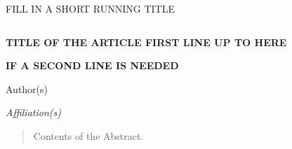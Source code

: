 \documentclass[10pt]{book}
\theoremstyle{definition}
\begin{document}

\renewcommand{\baselinestretch}{1.2}


{\hfill {\footnotesize\rm FILL IN A SHORT RUNNING TITLE} \hfill}

\renewcommand{\thefootnote}{}
$\ $\par


\fontsize{10.95}{14pt plus.8pt minus .6pt}\selectfont
\vspace{0.8pc}
\centerline{\large\bf TITLE OF THE ARTICLE FIRST LINE UP TO HERE}
\vspace{2pt}
\centerline{\large\bf IF A SECOND LINE IS NEEDED}
\vspace{.4cm}
\centerline{Author(s)}
\vspace{.4cm}
\centerline{\it Affiliation(s)}
\vspace{.55cm}
\fontsize{9}{11.5pt plus.8pt minus .6pt}\selectfont


\begin{quotation}
Contents of the Abstract.\par

\vspace{9pt}
\par
\end{quotation}\par



\def\thefigure{\arabic{figure}}
\def\thetable{\arabic{table}}
\end{document}
